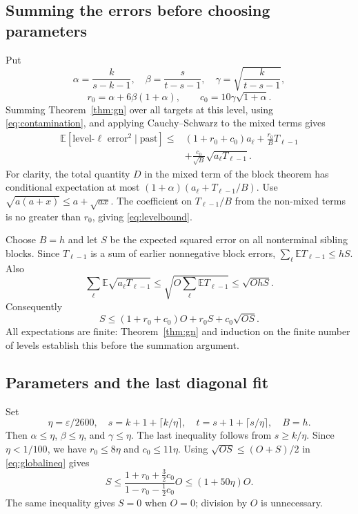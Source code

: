 \documentclass[11pt]{article}
\theoremstyle{remark}
\newcommand{\E}{\mathbb E}
\newcommand{\eps}{\varepsilon}
\begin{document}
\subsection{Summing the errors before choosing parameters}

Put
\[
 \alpha=\frac{k}{s-k-1},\quad
 \beta=\frac{s}{t-s-1},\quad
 \gamma=\sqrt{\frac{k}{t-s-1}},
\]
\[
 r_0=\alpha+6\beta(1+\alpha),\qquad
 c_0=10\gamma\sqrt{1+\alpha}.
\]
Summing Theorem~\ref{thm:gn} over all targets at this level, using
\eqref{eq:contamination}, and applying Cauchy--Schwarz to the mixed terms
gives
\begin{align}\label{eq:levelbound}
 \E[\text{level-}\ell\text{ error}^2\mid\text{past}]
 \le{}&(1+r_0+c_0)a_\ell+
       \frac{r_0}{B}T_{\ell-1}\\
 &+\frac{c_0}{\sqrt B}\sqrt{a_\ell T_{\ell-1}}.\nonumber
\end{align}
For clarity, the total quantity $D$ in the mixed term of the block theorem
has conditional expectation at most
$(1+\alpha)(a_\ell+T_{\ell-1}/B)$.
Use
$\sqrt{a(a+x)}\le a+\sqrt{ax}$.
The coefficient on $T_{\ell-1}/B$ from the non-mixed terms is no greater
than $r_0$, giving \eqref{eq:levelbound}.

Choose $B=h$ and let $S$ be the expected squared error on all nonterminal
sibling blocks. Since $T_{\ell-1}$ is a sum of earlier nonnegative block
errors, $\sum_\ell\E T_{\ell-1}\le hS$. Also
\[
 \sum_\ell\E\sqrt{a_\ell T_{\ell-1}}
 \le\sqrt{O\sum_\ell\E T_{\ell-1}}
 \le\sqrt{OhS}.
\]
Consequently
\begin{equation}\label{eq:globalineq}
 S\le(1+r_0+c_0)O+r_0S+c_0\sqrt{OS}.
\end{equation}
All expectations are finite: Theorem~\ref{thm:gn} and induction on the finite
number of levels establish this before the summation argument.

\subsection{Parameters and the last diagonal fit}

Set
\begin{equation}\label{eq:parameters}
 \eta=\eps/2600,\quad
 s=k+1+\lceil k/\eta\rceil,\quad
 t=s+1+\lceil s/\eta\rceil,\quad B=h.
\end{equation}
Then $\alpha\le\eta$, $\beta\le\eta$, and $\gamma\le\eta$.
The last inequality follows from $s\ge k/\eta$.
Since $\eta<1/100$, we have $r_0\le8\eta$ and $c_0\le11\eta$.
Using $\sqrt{OS}\le(O+S)/2$ in \eqref{eq:globalineq} gives
\[
 S\le\frac{1+r_0+\tfrac32c_0}{1-r_0-\tfrac12c_0}O
 \le(1+50\eta)O.
\]
The same inequality gives $S=0$ when $O=0$; division by $O$ is unnecessary.
\end{document}
